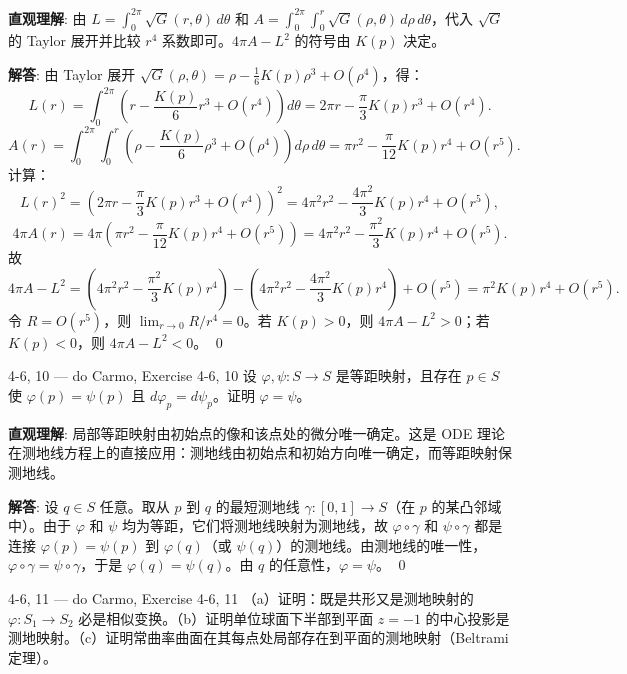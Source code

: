 \begin{solution}
\textbf{直观理解}: 由 $L = \int_0^{2\pi}\sqrt{G}(r,\theta)\, d\theta$ 和 $A = \int_0^{2\pi}\int_0^r \sqrt{G}(\rho,\theta)\, d\rho\, d\theta$，代入 $\sqrt{G}$ 的 Taylor 展开并比较 $r^4$ 系数即可。$4\pi A - L^2$ 的符号由 $K(p)$ 决定。

\textbf{解答}: 由 Taylor 展开 $\sqrt{G}(\rho,\theta) = \rho - \frac{1}{6}K(p)\rho^3 + O(\rho^4)$，得：
\[
L(r) = \int_0^{2\pi}\left(r - \frac{K(p)}{6}r^3 + O(r^4)\right)d\theta = 2\pi r - \frac{\pi}{3}K(p)r^3 + O(r^4).
\]
\[
A(r) = \int_0^{2\pi}\int_0^r\left(\rho - \frac{K(p)}{6}\rho^3 + O(\rho^4)\right)d\rho\, d\theta = \pi r^2 - \frac{\pi}{12}K(p)r^4 + O(r^5).
\]
计算：
\[
L(r)^2 = \left(2\pi r - \frac{\pi}{3}K(p)r^3 + O(r^4)\right)^2 = 4\pi^2 r^2 - \frac{4\pi^2}{3}K(p)r^4 + O(r^5),
\]
\[
4\pi A(r) = 4\pi\left(\pi r^2 - \frac{\pi}{12}K(p)r^4 + O(r^5)\right) = 4\pi^2 r^2 - \frac{\pi^2}{3}K(p)r^4 + O(r^5).
\]
故
\[
4\pi A - L^2 = \left(4\pi^2 r^2 - \frac{\pi^2}{3}K(p)r^4\right) - \left(4\pi^2 r^2 - \frac{4\pi^2}{3}K(p)r^4\right) + O(r^5) = \pi^2 K(p)r^4 + O(r^5).
\]
令 $R = O(r^5)$，则 $\lim_{r\to 0} R/r^4 = 0$。若 $K(p)>0$，则 $4\pi A - L^2 > 0$；若 $K(p)<0$，则 $4\pi A - L^2 < 0$。
\qed
\end{solution}

\begin{exercise}{4-6, 10 — do Carmo, Exercise 4-6, 10}
设 $\varphi, \psi: S \to S$ 是等距映射，且存在 $p \in S$ 使 $\varphi(p) = \psi(p)$ 且 $d\varphi_p = d\psi_p$。证明 $\varphi = \psi$。
\end{exercise}

\begin{solution}
\textbf{直观理解}: 局部等距映射由初始点的像和该点处的微分唯一确定。这是 ODE 理论在测地线方程上的直接应用：测地线由初始点和初始方向唯一确定，而等距映射保测地线。

\textbf{解答}: 设 $q \in S$ 任意。取从 $p$ 到 $q$ 的最短测地线 $\gamma:[0,1]\to S$（在 $p$ 的某凸邻域中）。由于 $\varphi$ 和 $\psi$ 均为等距，它们将测地线映射为测地线，故 $\varphi\circ\gamma$ 和 $\psi\circ\gamma$ 都是连接 $\varphi(p)=\psi(p)$ 到 $\varphi(q)$（或 $\psi(q)$）的测地线。由测地线的唯一性，$\varphi\circ\gamma = \psi\circ\gamma$，于是 $\varphi(q) = \psi(q)$。由 $q$ 的任意性，$\varphi = \psi$。
\qed
\end{solution}

\begin{exercise}{4-6, 11 — do Carmo, Exercise 4-6, 11}
（a）证明：既是共形又是测地映射的 $\varphi: S_1 \to S_2$ 必是相似变换。（b）证明单位球面下半部到平面 $z=-1$ 的中心投影是测地映射。（c）证明常曲率曲面在其每点处局部存在到平面的测地映射（Beltrami 定理）。
\end{exercise}

